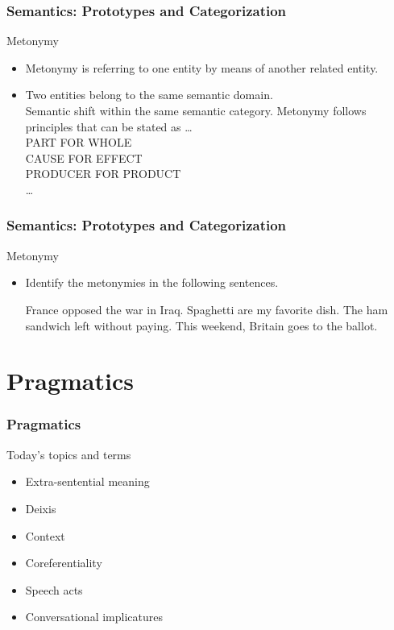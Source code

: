 \documentclass[12pt, table]{beamer}
\begin{document}
\begin{frame}
\frametitle{Semantics: Prototypes and Categorization}
Metonymy
\begin{itemize}
\item Metonymy is referring to one entity by means of another related entity.
\item Two entities belong to the same semantic domain.\\
Semantic shift within the same semantic category.
Metonymy follows principles that can be stated as \dots \\
PART FOR WHOLE\\
CAUSE FOR EFFECT\\
PRODUCER FOR PRODUCT\\
\dots
\end{itemize}
\end{frame}

\begin{frame}
\frametitle{Semantics: Prototypes and Categorization}
Metonymy
\begin{itemize}
\item Identify the metonymies in the following sentences.
\begin{exe}
\ex France opposed the war in Iraq.
\ex Spaghetti are my favorite dish.
\ex The ham sandwich left without paying.
\ex This weekend, Britain goes to the ballot.
\end{exe}
\end{itemize}
\end{frame}

\section{Pragmatics}
\begin{frame}
\frametitle{Pragmatics}
Today's topics and terms
\begin{itemize}
\item Extra-sentential meaning
\item Deixis
\item Context
\item Coreferentiality
\item Speech acts
\item Conversational implicatures
\end{itemize}
\end{frame}
\end{document}
